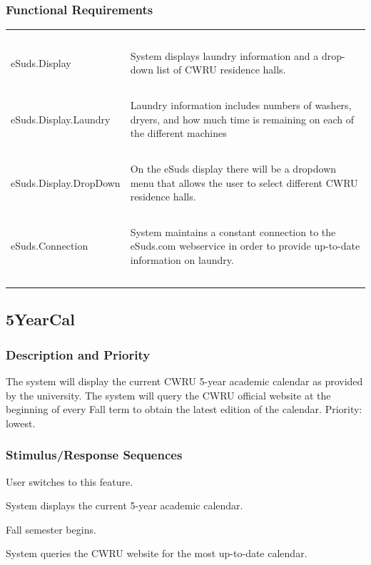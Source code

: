 \documentclass[pdftex,12pt,letter]{article}
\begin{document}
\subsubsection{Functional Requirements}
\begin{table}[!h]
\begin{tabularx}{\textwidth}[t]{|l Y|}
\hline
~&~\\
eSuds.Display & System displays laundry information and a drop-down list of CWRU residence halls.\\ 
~&~\\
eSuds.Display.Laundry & Laundry information includes numbers of washers, dryers, and how much time is remaining on each of the different machines \\
~&~\\
eSuds.Display.DropDown & On the eSuds display there will be a dropdown menu that allows the user to select different CWRU residence halls.\\
~&~\\
eSuds.Connection & System maintains a constant connection to the eSuds.com webservice in order to provide up-to-date information on laundry.\\
~&~\\
\hline
\end{tabularx}
\end{table}
\FloatBarrier
\subsection{5YearCal}
\subsubsection{Description and Priority}
The system will display the current CWRU 5-year academic calendar as provided by the university. The system will query the CWRU official website at the beginning of every Fall term to obtain the latest edition of the calendar. Priority: lowest.
\subsubsection{Stimulus/Response Sequences}
\begin{description}\itemsep1pt
\item[Stimulus:] User switches to this feature.
\item[Response:] System displays the current 5-year academic calendar.
\item[Stimulus:] Fall semester begins.
\item[Response:] System queries the CWRU website for the most up-to-date calendar.
\end{description}
\end{document}
